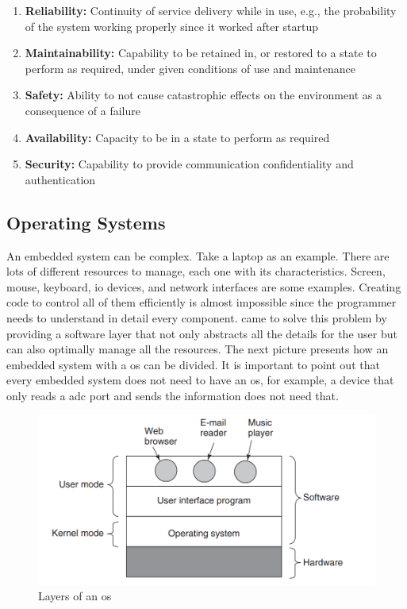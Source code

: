 \begin{enumerate}
    \item \textbf{Reliability:} Continuity of service delivery while in use, e.g., the probability of the system working properly since it 
	worked after startup

    \item \textbf{Maintainability:} Capability to be retained in, or restored to a state to perform as required, under given conditions of 
	use and maintenance

    \item \textbf{Safety:} Ability to not cause catastrophic effects on the environment as a consequence of a 
	failure

    \item \textbf{Availability:} Capacity to be in a state to perform as required 
    
    \item \textbf{Security:} Capability to provide communication confidentiality and authentication
    
\end{enumerate}


\subsection{Operating Systems}

An embedded system can be complex. Take a laptop as an example. There are lots of different resources to manage, each one with its 
characteristics. Screen, mouse, keyboard, \gls{io} devices, and network interfaces are some examples. Creating code to control all of them 
efficiently is almost impossible since the programmer needs to understand in detail every component.  came to solve this 
problem by providing a software layer that not only abstracts all the details for the user but can also optimally manage all the resources. 
The next picture presents how an embedded system with a \gls{os} can be divided. It is important to point out that every embedded system does 
not need to have an \gls{os}, for example, a device that only reads a \gls{adc} port and sends the information does not need that. 

\begin{figure}[H]
	\centering
 	\includegraphics[width=0.6\linewidth]{Images/OS_overview.png}
 	\caption{Layers of an \gls{os} \cite{OSbook} }
	 \label{fig_OSoverview}
\end{figure}

